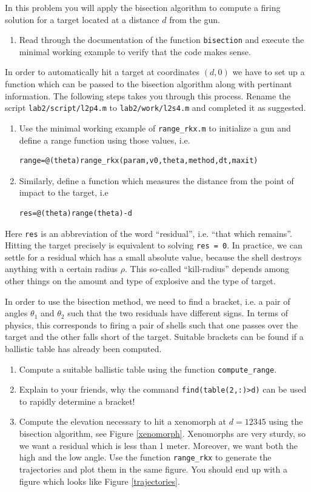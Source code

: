 \documentclass[a4paper,12pt]{article}
\newcounter{problem}
\newenvironment{problem}{\refstepcounter{problem} \noindent {\bf Problem \arabic{problem}}}{\newpage}
\begin{document}
\begin{problem} In this problem you will apply the bisection algorithm to compute a firing solution for a target located at a distance $d$ from the gun. 
\begin{enumerate}
\item Read through the documentation of the function {\tt bisection} and execute the minimal working example to verify that the code makes sense. 
\end{enumerate}
In order to automatically hit a target at coordinates $(d,0)$ we have to set up a function which can be passed to the bisection algorithm along with pertinant information. The following steps takes you through this process. Rename the script {\tt lab2/script/l2p4.m} to {\tt lab2/work/l2s4.m} and completed it as suggested.
\begin{enumerate}[resume]
\item Use the minimal working example of {\tt range\_rkx.m} to initialize a gun and define a range function using those values, i.e.
\begin{verbatim}
range=@(theta)range_rkx(param,v0,theta,method,dt,maxit)
\end{verbatim}
\item Similarly, define a function which measures the distance from the point of impact to the target, i.e
\begin{verbatim}
res=@(theta)range(theta)-d
\end{verbatim} 
\end{enumerate} 
Here {\tt res} is an abbreviation of the word ``residual'', i.e. ``that which remains''. Hitting the target precisely is equivalent to solving {\tt res = 0}. In practice, we can settle for a residual which has a small absolute value, because the shell destroys anything with a certain radius $\rho$. This so-called ``kill-radius'' depends among other things on the amount and type of explosive and the type of target.

In order to use the bisection method, we need to find a bracket, i.e. a pair of angles $\theta_1$ and $\theta_2$ such that the two residuals have different signs. In terms of physics, this corresponds to firing a pair of shells such that one passes over the target and the other falls short of the target. Suitable brackets can be found if a ballistic table has already been computed.
\begin{enumerate}[resume]
\item Compute a suitable ballistic table using the function {\tt compute\_range}.
\item Explain to your friends, why the command {\tt find(table(2,:)>d)} can be used to rapidly determine a bracket!
\item Compute the elevation necessary to hit a xenomorph at $d = 12345$ using the bisection algorithm, see Figure \ref{xenomorph}. Xenomorphs are very sturdy, so we want a residual which is less than 1 meter. Moreover, we want both the high and the low angle. Use the function {\tt range\_rkx} to generate the trajectories and plot them in the same figure. You should end up with a figure which looks like Figure \ref{trajectories}.


\end{enumerate}
\end{problem}
\end{document}
